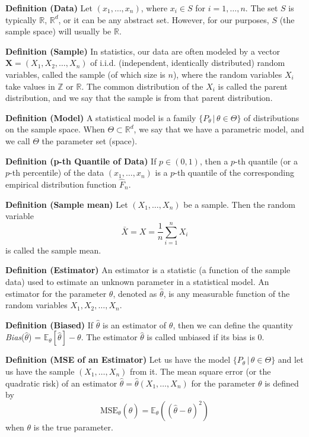 \documentclass[12pt,a4paper,oneside]{book} %
\begin{document}
\textbf{Definition (Data)} Let $(x_1, \ldots, x_n)$, where $x_i \in S$ for $i = 1, \ldots, n$. The set $S$ is typically $\mathbb{R}$, $\mathbb{R}^d$, or it can be any abstract set. However, for our purposes, $S$ (the sample space) will usually be $\mathbb{R}$.

\textbf{Definition (Sample)} In statistics, our data are often modeled by a vector $\mathbf{X} = (X_1, X_2, \ldots, X_n)$ of i.i.d. (independent, identically distributed) random variables, called the sample (of which size is $n$), where the random variables $X_i$ take values in $\mathbb{Z}$ or $\mathbb{R}$. The common distribution of the $X_i$ is called the parent distribution, and we say that the sample is from that parent distribution.

\textbf{Definition (Model)} A statistical model is a family $\{P_{\theta} \,|\, \theta \in \Theta\}$ of distributions on the sample space. When $\Theta \subset \mathbb{R}^d$, we say that we have a parametric model, and we call $\Theta$ the parameter set (space).

\textbf{Definition (p-th Quantile of Data)} If $p \in (0, 1)$, then a $p$-th quantile (or a $p$-th percentile) of the data $(x_1, \ldots, x_n)$ is a $p$-th quantile of the corresponding empirical distribution function $\hat{F}_n$.

\textbf{Definition (Sample mean)} Let $(X_1, \ldots, X_n)$ be a sample. Then the random variable
\[ \bar{X} = X = \frac{1}{n} \sum_{i=1}^{n} X_i \]
is called the sample mean.

\textbf{Definition (Estimator)} An estimator is a statistic (a function of the sample data) used to estimate an unknown parameter in a statistical model. An estimator for the parameter $\theta$, denoted as $\hat{\theta}$, is any measurable function of the random variables $X_1, X_2, \ldots, X_n$.

\textbf{Definition (Biased)} If $\hat{\theta}$ is an estimator of $\theta$, then we can define the quantity \textit{Bias}($\hat{\theta}$) = $\mathbb{E}_{\theta}[\hat{\theta}] - \theta$. The estimator $\hat{\theta}$ is called unbiased if its bias is 0.

\textbf{Definition (MSE of an Estimator)} Let us have the model $\{P_{\theta} \,|\, \theta \in \Theta\}$ and let us have the sample $(X_1, \ldots, X_n)$ from it. The mean square error (or the quadratic risk) of an estimator $\hat{\theta} = \hat{\theta}(X_1, \ldots, X_n)$ for the parameter $\theta$ is defined by
\[ \text{MSE}_{\theta}(\hat{\theta}) = \mathbb{E}_{\theta}((\hat{\theta} - \theta)^2) \]
when $\theta$ is the true parameter.
\end{document}
